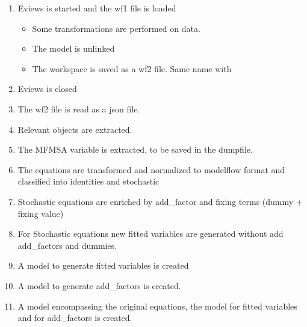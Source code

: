\documentclass[letterpaper,10pt,english]{jupyterBook}
\begin{document}
\begin{enumerate}
%
\item {} 
\sphinxAtStartPar
Eviews is started and the wf1 file is loaded
\begin{itemize}
\item {} 
\sphinxAtStartPar
Some transformations are performed on data.

\item {} 
\sphinxAtStartPar
The model is unlinked

\item {} 
\sphinxAtStartPar
The workspace is saved as a wf2 file. Same name with 

\end{itemize}

\item {} 
\sphinxAtStartPar
Eviews is closed

\item {} 
\sphinxAtStartPar
The wf2 file is read as a json file.

\item {} 
\sphinxAtStartPar
Relevant objects are extracted.

\item {} 
\sphinxAtStartPar
The MFMSA variable is  extracted, to be saved in the dumpfile.

\item {} 
\sphinxAtStartPar
The equations are transformed and normalized to modelflow format and classified into identities and stochastic

\item {} 
\sphinxAtStartPar
Stochastic equations are enriched by add\_factor and fixing terms (dummy + fixing value)

\item {} 
\sphinxAtStartPar
For Stochastic equations new fitted variables are generated \sphinxhyphen{} without add add\_factors and dummies.

\item {} 
\sphinxAtStartPar
A model to generate fitted variables is created

\item {} 
\sphinxAtStartPar
A model to generate add\_factors is created.

\item {} 
\sphinxAtStartPar
A model encompassing the original equations, the model for fitted variables and for add\_factors is created.


\end{enumerate}
\end{document}
